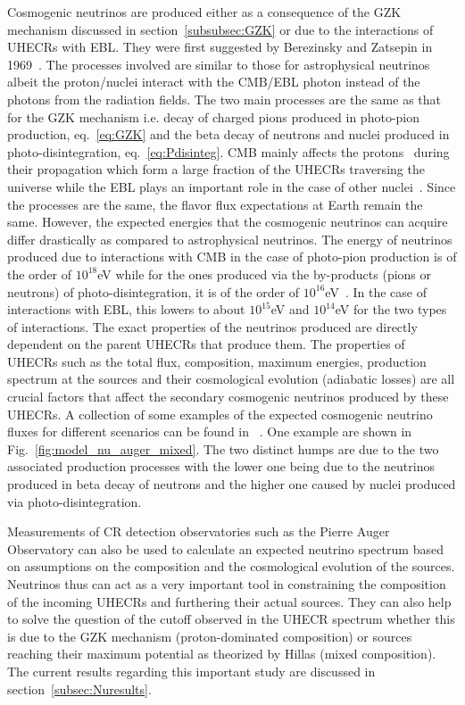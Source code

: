 Cosmogenic neutrinos are produced either as a consequence of the \gls{GZK} mechanism discussed in section~\ref{subsubsec:GZK} or due to the interactions of \glspl{UHECR} with \gls{EBL}. They were first suggested by Berezinsky and Zatsepin in 1969~\cite{Berezinsky:1970xj}. The processes involved are similar to those for astrophysical neutrinos albeit the proton/nuclei interact with the CMB/EBL photon instead of the photons from the radiation fields. The two main processes are the same as that for the GZK mechanism i.e. decay of charged pions produced in photo-pion production, eq.~\ref{eq:GZK} and the beta decay of neutrons and nuclei produced in photo-disintegration, eq.~\ref{eq:Pdisinteg}. \gls{CMB} mainly affects the protons~\cite{Ehlert_2024} during their propagation which form a large fraction of the \glspl{UHECR} traversing the universe while the EBL plays an important role in the case of other nuclei~\cite{Aloisio_2015}. 
Since the processes are the same, the flavor flux expectations at Earth remain the same. However, the expected energies that the cosmogenic neutrinos can acquire differ drastically as compared to astrophysical neutrinos. The energy of neutrinos produced due to interactions with \gls*{CMB} in the case of photo-pion production is of the order of $10^{18}$eV while for the ones produced via the by-products (pions or neutrons) of photo-disintegration, it is of the order of $10^{16}$eV~\cite{Aloisio_2015}. In the case of interactions with \gls*{EBL}, this lowers to about $10^{15}$eV and $10^{14}$eV for the two types of interactions. 
The exact properties of the neutrinos produced are directly dependent on the parent \glspl*{UHECR} that produce them. The properties of \glspl{UHECR} such as the total flux, composition, maximum energies, production spectrum at the sources and their cosmological evolution (adiabatic losses) are all crucial factors that affect the  secondary cosmogenic neutrinos produced by these \glspl*{UHECR}. A collection of some examples of the expected cosmogenic neutrino fluxes for different scenarios can be found in ~\cite{KAMPERT2012660,AlvesBatista:2018zui,Heinze:2019jou}. One example are shown in Fig.~\ref{fig:model_nu_auger_mixed}. The two distinct humps are due to the two associated production processes with the lower one being due to the neutrinos produced in beta decay of neutrons and the higher one caused by nuclei produced via photo-disintegration. 

Measurements of \gls*{CR} detection observatories such as the Pierre Auger Observatory can also be used to calculate an expected neutrino spectrum based on assumptions on the composition and the cosmological evolution of the sources. Neutrinos thus can act as a very important tool in constraining the composition of the incoming \glspl*{UHECR} and furthering their actual sources. They can also help to solve the question of the cutoff observed in the \gls*{UHECR} spectrum whether this is due to the \gls*{GZK} mechanism (proton-dominated composition) or sources reaching their maximum potential as theorized by Hillas (mixed composition). The current results regarding this important study are discussed in section~\ref{subsec:Nuresults}.
